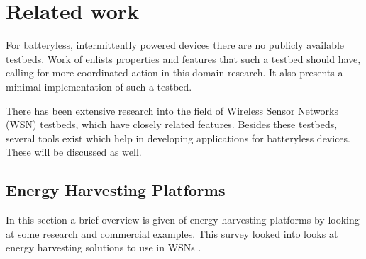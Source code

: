\chapter{Related work}
\label{chp:related-work}


For batteryless, intermittently powered devices there are no publicly available testbeds. Work of \cite{request} enlists properties and features that such a testbed should have, calling for more coordinated action in this domain research. It also presents a minimal implementation of such a testbed.

There has been extensive research into the field of Wireless Sensor Networks (WSN) testbeds, which have closely related features. Besides these testbeds, several tools exist which help in developing applications for batteryless devices. These will be discussed as well.

\section{Energy Harvesting Platforms}

In this section a brief overview is given of energy harvesting platforms by looking at some research and commercial examples. This survey looked into looks at energy harvesting solutions to use in WSNs \cite{energywsn}.

